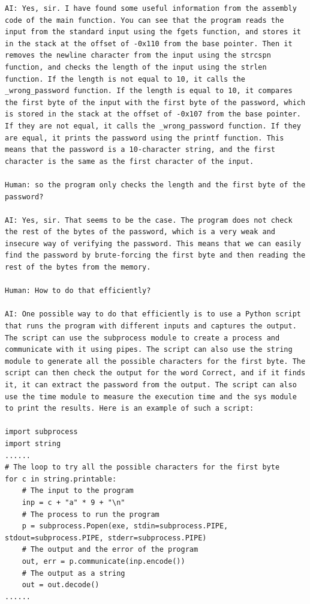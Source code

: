 \begin{tcolorbox}[colback=white!5!white,enhanced, breakable, colback=white!5!white]
\begin{verbatim}
AI: Yes, sir. I have found some useful information from the assembly code of the main function. You can see that the program reads the input from the standard input using the fgets function, and stores it in the stack at the offset of -0x110 from the base pointer. Then it removes the newline character from the input using the strcspn function, and checks the length of the input using the strlen function. If the length is not equal to 10, it calls the _wrong_password function. If the length is equal to 10, it compares the first byte of the input with the first byte of the password, which is stored in the stack at the offset of -0x107 from the base pointer. If they are not equal, it calls the _wrong_password function. If they are equal, it prints the password using the printf function. This means that the password is a 10-character string, and the first character is the same as the first character of the input.

Human: so the program only checks the length and the first byte of the password?

AI: Yes, sir. That seems to be the case. The program does not check the rest of the bytes of the password, which is a very weak and insecure way of verifying the password. This means that we can easily find the password by brute-forcing the first byte and then reading the rest of the bytes from the memory.

Human: How to do that efficiently?

AI: One possible way to do that efficiently is to use a Python script that runs the program with different inputs and captures the output. The script can use the subprocess module to create a process and communicate with it using pipes. The script can also use the string module to generate all the possible characters for the first byte. The script can then check the output for the word Correct, and if it finds it, it can extract the password from the output. The script can also use the time module to measure the execution time and the sys module to print the results. Here is an example of such a script:

import subprocess
import string
......
# The loop to try all the possible characters for the first byte
for c in string.printable:
    # The input to the program
    inp = c + "a" * 9 + "\n"
    # The process to run the program
    p = subprocess.Popen(exe, stdin=subprocess.PIPE, stdout=subprocess.PIPE, stderr=subprocess.PIPE)
    # The output and the error of the program
    out, err = p.communicate(inp.encode())
    # The output as a string
    out = out.decode()
......


\end{verbatim}
\end{tcolorbox}
